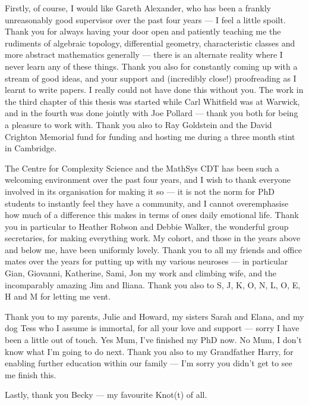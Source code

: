 Firstly, of course, I would like Gareth Alexander, who has been a frankly unreasonably good supervisor over the past four years --- I feel a little spoilt. Thank you for always having your door open and patiently teaching me the rudiments of algebraic topology, differential geometry, characteristic classes and more abstract mathematics generally --- there is an alternate reality where I never learn any of these things. Thank you also for constantly coming up with a stream of good ideas, and your support and (incredibly close!) proofreading as I learnt to write papers. I really could not have done this without you. The work in the third chapter of this thesis was started while Carl Whitfield was at Warwick, and in the fourth was done jointly with Joe Pollard --- thank you both for being a pleasure to work with. Thank you also to Ray Goldstein and the David Crighton Memorial fund for funding and hosting me during a three month stint in Cambridge.  

The Centre for Complexity Science and the MathSys CDT has been such a welcoming environment over the past four years, and I wish to thank everyone involved in its organisation for making it so --- it is not the norm for PhD students to instantly feel they have a community, and I cannot overemphasise how much of a difference this makes in terms of ones daily emotional life. Thank you in particular to Heather Robson and Debbie Walker, the wonderful group secretaries, for making everything work.  My cohort, and those in the years above and below me, have been uniformly lovely. Thank you to all my friends and office mates over the years for putting up with my various neuroses --- in particular Gian, Giovanni, Katherine, Sami, Jon my work and climbing wife, and the incomparably amazing Jim and Iliana. Thank you also to S, J, K, O, N, L, O, E, H and M for letting me vent.

Thank you to my parents, Julie and Howard, my sisters Sarah and Elana, and my dog Tess who I assume is immortal, for all your love and support --- sorry I have been a little out of touch. Yes Mum, I've finished my PhD now. No Mum, I don't know what I'm going to do next. Thank you also to my Grandfather Harry, for enabling further education within our family --- I'm sorry you didn't get to see me finish this.

 Lastly, thank you Becky --- my favourite Knot(t) of all.

